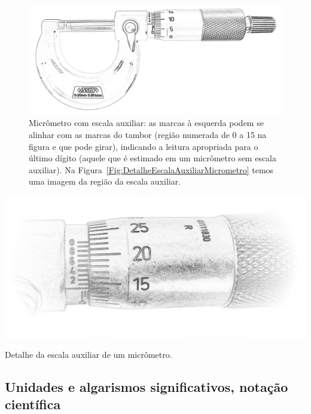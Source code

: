 \begin{figure}\forcerectofloat
\centering
\includegraphics[width=\linewidth]{Ilustrations/Micrometro_com_escala_auxiliar.png}
\caption{Micrômetro com escala auxiliar: as marcas à esquerda podem se alinhar com as marcas do tambor (região numerada de 0 a 15 na figura e que pode girar), indicando a leitura apropriada para o último dígito (aquele que é estimado em um micrômetro sem escala auxiliar). Na Figura~\ref{Fig:DetalheEscalaAuxiliarMicrometro} temos uma imagem da região da escala auxiliar.}
\end{figure}

\begin{marginfigure}
\centering
\includegraphics[width=\linewidth]{Ilustrations/Micrometro_com_escala_auxiliar_detalhe.png}
\caption{Detalhe da escala auxiliar de um micrômetro.\label{Fig:DetalheEscalaAuxiliarMicrometro}}
\end{marginfigure}

\subsection{Unidades e algarismos significativos, notação científica}
\label{Sec:UnidadesAlgSigNotacaoCientifica}

